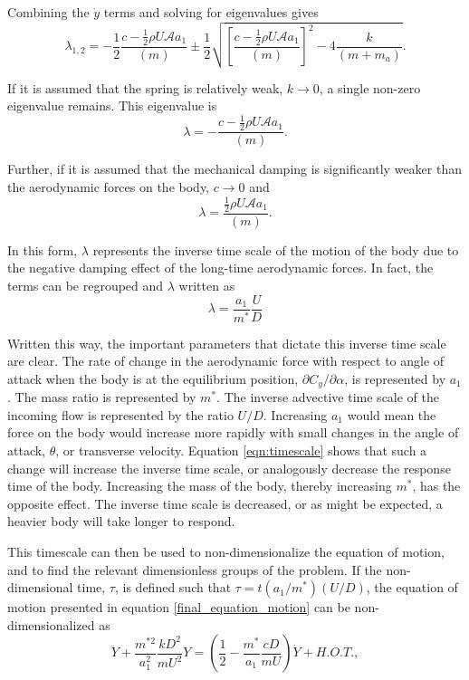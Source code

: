  Combining the $\dot{y}$ terms and solving for eigenvalues gives
 \begin{equation}
   \label{eqn:eigs}
   \lambda_{1,2}= -\frac{1}{2}\frac{c-\frac{1}{2}\rho U\mathcal{A}a_1}{(m)}\pm\frac{1}{2}\sqrt{\left[\frac{c-\frac{1}{2}\rho U\mathcal{A}a_1}{(m)}\right]^2-4\frac{k}{(m+m_a)}}.
 \end{equation}
 
 If it is assumed that the spring is relatively weak, $k\rightarrow 0$, a single non-zero eigenvalue remains. This eigenvalue is
 \begin{equation}
   \label{eqn:eigs_nospring}
   \lambda=-\frac{c-\frac{1}{2}\rho U\mathcal{A}a_1}{(m)}.
 \end{equation}
 
 Further, if it is assumed that the mechanical damping is significantly weaker than the aerodynamic forces on the body, $c\rightarrow 0$ and
 \begin{equation}
   \label{eqn:eigs_nospring_nodamp}
   \lambda=\frac{\frac{1}{2}\rho U\mathcal{A}a_1}{(m)}.
 \end{equation}
 

 In this form, $\lambda$ represents the inverse time scale of the motion of the body due to the negative damping effect of the long-time aerodynamic forces. In fact, the terms can be regrouped and $\lambda$ written as
 \begin{equation}
   \label{eqn:timescale}
   \lambda = \frac{a_1}{m^*}\frac{U}{D}
 \end{equation}
 
 Written this way, the important parameters that dictate this inverse time scale are clear. The rate of change in the aerodynamic force with respect to angle of attack when the body is at the equilibrium position, $\partial C_y/\partial \alpha$, is represented by $a_1$. The mass ratio is represented by $m^*$. The inverse advective time scale of the incoming flow is represented by the ratio $U/D$. Increasing $a_1$ would mean the force on the body would increase more rapidly with small changes in the angle of attack, $\theta$, or transverse velocity. Equation \ref{eqn:timescale} shows that such a change will increase the inverse time scale, or analogously decrease the response time of the body. Increasing the mass of the body, thereby increasing $m^*$, has the opposite effect. The inverse time scale is decreased, or as might be expected, a heavier body will take longer to respond.
 
 This timescale can then be used to non-dimensionalize the equation of motion, and to find the relevant dimensionless groups of the problem. If the non-dimensional time, $\tau$, is defined such that $\tau=t(a_1/m^*)(U/D)$, the equation of motion presented in equation \ref{final_equation_motion} can be non-dimensionalized as
 \begin{equation}
   \label{eqn:eom_nondim}
   \ddot{Y} + \frac{m^{*2}}{a_1^2}\frac{kD^2}{mU^2}Y = \left(\frac{1}{2} - \frac{m^*}{a_1}\frac{cD}{mU}\right)\dot{Y} + H.O.T.,
 \end{equation}
 
